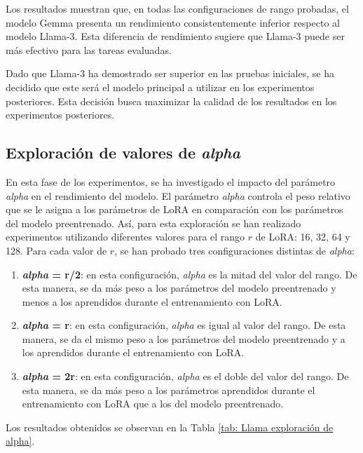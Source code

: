 \documentclass[11pt,spanish,listoffigures,listoftables]{tfgetsinf}
\begin{document}
Los resultados muestran que, en todas las configuraciones de rango probadas, el modelo Gemma presenta un rendimiento consistentemente inferior respecto al modelo Llama-3. Esta diferencia de rendimiento sugiere que Llama-3 puede ser más efectivo para las tareas evaluadas.

Dado que Llama-3 ha demostrado ser superior en las pruebas iniciales, se ha decidido que este será el modelo principal a utilizar en los experimentos posteriores. Esta decisión busca maximizar la calidad de los resultados en los experimentos posteriores.

\subsection{Exploración de valores de \textit{alpha}}

En esta fase de los experimentos, se ha investigado el impacto del parámetro \textit{alpha} en el rendimiento del modelo. El parámetro \textit{alpha} controla el peso relativo que se le asigna a los parámetros de LoRA en comparación con los parámetros del modelo preentrenado. Así, para esta exploración se han realizado experimentos utilizando diferentes valores para el rango $r$ de LoRA: 16, 32, 64 y 128. Para cada valor de $r$, se han probado tres configuraciones distintas de \textit{alpha}:

\begin{enumerate}
	\item \textbf{\textit{alpha} = r/2}: en esta configuración, \textit{alpha} es la mitad del valor del rango. De esta manera, se da más peso a los parámetros del modelo preentrenado y menos a los aprendidos durante el entrenamiento con LoRA.
	\item \textbf{\textit{alpha} = r}: en esta configuración, \textit{alpha} es igual al valor del rango. De esta manera, se da el mismo peso a los parámetros del modelo preentrenado y a los aprendidos durante el entrenamiento con LoRA.
	\item \textbf{\textit{alpha} = 2r}: en esta configuración, \textit{alpha} es el doble del valor del rango. De esta manera, se da más peso a los parámetros aprendidos durante el entrenamiento con LoRA que a los del modelo preentrenado.
\end{enumerate}

Los resultados obtenidos se observan en la Tabla \ref{tab: Llama exploración de alpha}.
\end{document}
